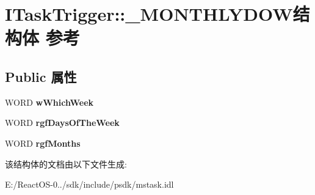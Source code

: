 \hypertarget{struct_i_task_trigger_1_1___m_o_n_t_h_l_y_d_o_w}{}\section{I\+Task\+Trigger\+:\+:\+\_\+\+M\+O\+N\+T\+H\+L\+Y\+D\+O\+W结构体 参考}
\label{struct_i_task_trigger_1_1___m_o_n_t_h_l_y_d_o_w}
\subsection*{Public 属性}
\begin{DoxyCompactItemize}
\item 
\mbox{\label{struct_i_task_trigger_1_1___m_o_n_t_h_l_y_d_o_w_af0b8c6d051f05f0d9bf07a0ca857765b}} 
W\+O\+RD {\bfseries w\+Which\+Week}
\item 
\mbox{\label{struct_i_task_trigger_1_1___m_o_n_t_h_l_y_d_o_w_abe5b189433bb3dcca68554e316e2e3e8}} 
W\+O\+RD {\bfseries rgf\+Days\+Of\+The\+Week}
\item 
\mbox{\label{struct_i_task_trigger_1_1___m_o_n_t_h_l_y_d_o_w_a7d30d1431701cadffedbafb57930ab17}} 
W\+O\+RD {\bfseries rgf\+Months}
\end{DoxyCompactItemize}


该结构体的文档由以下文件生成\+:\begin{DoxyCompactItemize}
\item 
E\+:/\+React\+O\+S-\/0../sdk/include/psdk/mstask.\+idl\end{DoxyCompactItemize}
